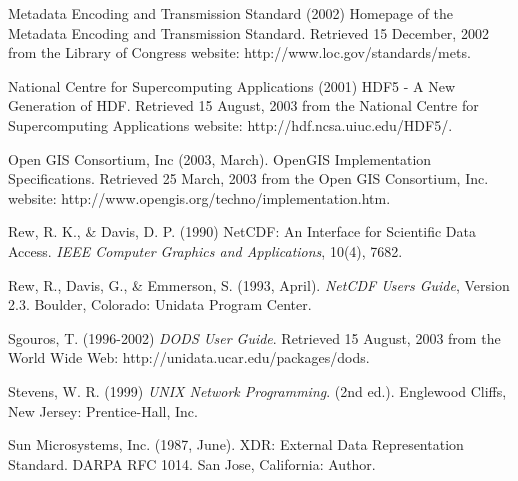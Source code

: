 \documentclass{codata}
\begin{document}
Metadata Encoding and Transmission Standard (2002) Homepage of the
Metadata Encoding and Transmission Standard. Retrieved 15 December,
2002 from the Library of Congress website:
http://www.loc.gov/standards/mets. 

National Centre for Supercomputing Applications (2001) HDF5 - A New
Generation of HDF. Retrieved 15 August, 2003 from the National Centre
for Supercomputing Applications website:
http://hdf.ncsa.uiuc.edu/HDF5/.  

Open GIS Consortium, Inc (2003, March). OpenGIS Implementation Specifications.
Retrieved 25 March, 2003 from the Open GIS Consortium, Inc. website:
http://www.opengis.org/techno/implementation.htm.  

Rew, R. K., \& Davis, D. P. (1990) NetCDF: An Interface for Scientific
Data Access. \emph{IEEE Computer Graphics and Applications}, 10(4), 7682. 

Rew, R., Davis, G., \& Emmerson, S. (1993, April). \emph{NetCDF Users Guide},
Version 2.3. Boulder, Colorado: Unidata Program Center. 

Sgouros, T. (1996-2002) \emph{DODS User Guide}. Retrieved 15 August, 2003
from the World Wide Web: http://unidata.ucar.edu/packages/dods. 


Stevens, W. R. (1999) \emph{UNIX Network Programming}. (2nd ed.). Englewood
Cliffs, New Jersey: Prentice-Hall, Inc.

Sun Microsystems, Inc. (1987, June). XDR: External Data Representation
Standard. DARPA RFC 1014. San Jose, California: Author.
\end{document}
